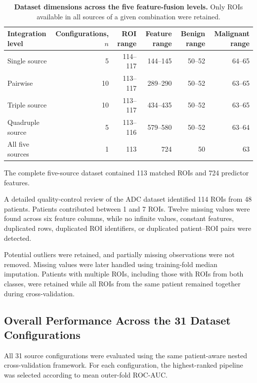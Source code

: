\documentclass[12pt,twocolumn]{article}
\begin{document}
\begin{table}[htbp]
\centering
\caption{\textbf{Dataset dimensions across the five feature-fusion
levels.} Only ROIs available in all sources of a given combination
were retained.}
\label{tab:fusion_dataset_characteristics}
\small
\begin{tabular}{lrrrrr}
\toprule
\textbf{Integration level} &
\textbf{Configurations, \(n\)} &
\textbf{ROI range} &
\textbf{Feature range} &
\textbf{Benign range} &
\textbf{Malignant range} \\
\midrule
Single source       & 5  & 114--117 & 144--145 & 50--52 & 64--65 \\
Pairwise            & 10 & 113--117 & 289--290 & 50--52 & 63--65 \\
Triple source       & 10 & 113--117 & 434--435 & 50--52 & 63--65 \\
Quadruple source    & 5  & 113--116 & 579--580 & 50--52 & 63--64 \\
All five sources    & 1  & 113      & 724      & 50     & 63 \\
\bottomrule
\end{tabular}
\end{table}

The complete five-source dataset contained 113 matched ROIs and 724
predictor features.

A detailed quality-control review of the ADC dataset identified
114 ROIs from 48 patients. Patients contributed between 1 and 7 ROIs.
Twelve missing values were found across six feature columns, while no
infinite values, constant features, duplicated rows, duplicated ROI
identifiers, or duplicated patient--ROI pairs were detected.

Potential outliers were retained, and partially missing observations
were not removed. Missing values were later handled using
training-fold median imputation. Patients with multiple ROIs,
including those with ROIs from both classes, were retained while all
ROIs from the same patient remained together during cross-validation.


\subsection{Overall Performance Across the 31 Dataset Configurations}
\label{subsec:overall_31_configurations}

All 31 source configurations were evaluated using the same
patient-aware nested cross-validation framework. For each
configuration, the highest-ranked pipeline was selected according to
mean outer-fold ROC-AUC.
\end{document}
